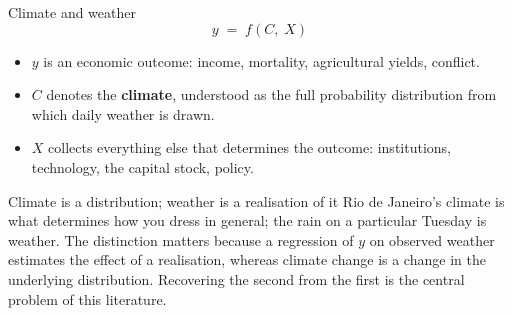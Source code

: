 \documentclass[aspectratio=169,10pt]{beamer}
\begin{document}
\begin{frame}{Climate and weather}
  \[
    y \;=\; f(C,\; X)
  \]
  \begin{itemize}
    \item $y$ is an economic outcome: income, mortality, agricultural yields,
          conflict.
    \item $C$ denotes the \textbf{climate}, understood as the full probability
          distribution from which daily weather is drawn.
    \item $X$ collects everything else that determines the outcome: institutions,
          technology, the capital stock, policy.
  \end{itemize}
  \vspace{4pt}
  \begin{block}{Climate is a distribution; weather is a realisation of it}
    \small Rio de Janeiro's climate is what determines how you dress in general;
    the rain on a particular Tuesday is weather. The distinction matters because a
    regression of $y$ on observed weather estimates the effect of a realisation,
    whereas climate change is a change in the underlying distribution. Recovering
    the second from the first is the central problem of this literature.
  \end{block}
\end{frame}
\end{document}
